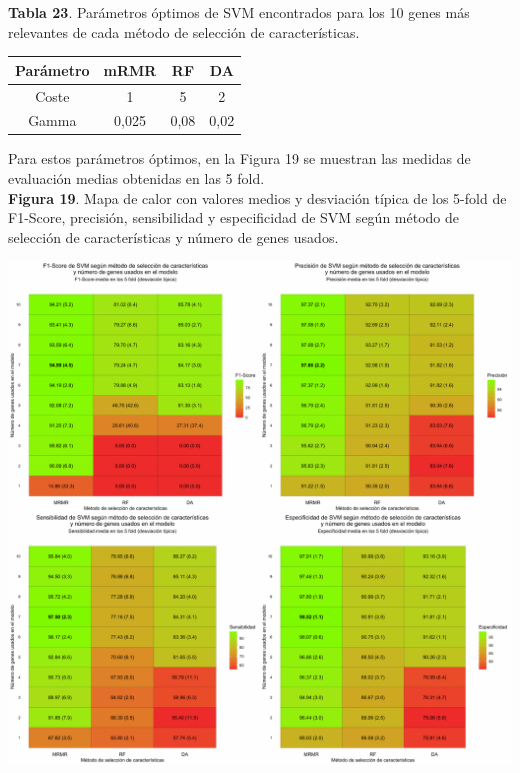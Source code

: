\textbf{Tabla 23}. Parámetros óptimos de SVM encontrados para los 10 genes más relevantes de cada método de selección de características.

\begin{table}[H]
	\centering
	\begin{tabular}{cccc}
		\hline
		\textbf{Parámetro} & \textbf{mRMR} & \textbf{RF} & \textbf{DA} \\ \hline
		Coste                &    1 &    5     &   2       \\
		Gamma               &     0,025    &     0,08   & 0,02        \\ \hline
	\end{tabular}
\end{table}

Para estos parámetros óptimos, en la Figura 19 se muestran las medidas de evaluación medias obtenidas en las 5 fold.\\

\newpage
\textbf{Figura 19}. Mapa de calor con valores medios y desviación típica de los 5-fold de F1-Score, precisión, sensibilidad y especificidad de SVM según método de selección de características y número de genes usados.
\begin{center}
	\includegraphics[width=1\textwidth]{figuras/19_higado_multiclase_heatmap_svm.pdf} 
\end{center}

